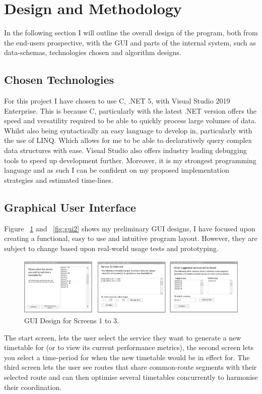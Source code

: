 \documentclass{article}
\newcommand{\CS}{C\nolinebreak\hspace{-.05em}\raisebox{.6ex}{\tiny\bf \#}}
\begin{document}
\section{Design and Methodology}

In the following section I will outline the overall design of the program, both from the end-users prospective, with the GUI and parts of the internal system, such as data-schemas, technologies chosen and algorithm designs.


\subsection{Chosen Technologies}
For this project I have chosen to use \CS, .NET 5, with Visual Studio 2019 Enterprise. This is because \CS, particularly with the latest .NET version offers the speed and versatility required to be able to quickly process large volumes of data. Whilst also being syntactically an easy language to develop in, particularly with the use of LINQ. Which allows for me to be able to declaratively query complex data structures with ease. Visual Studio also offers industry leading debugging tools to speed up development further. Moreover, it is my strongest programming language and as such I can be confident on my proposed implementation strategies and estimated time-lines.

\subsection{Graphical User Interface}

Figure ~\ref{fig:gui1} and ~\ref{fig:gui2} shows my preliminary GUI designs, I have focused upon creating a functional, easy to use and intuitive program layout. However, they are subject to change based upon real-world usage tests and prototyping.  

\begin{figure}[H]
	\centering
	\includegraphics[height=105px]{images/GUI_1.png}
	\caption{GUI Design for Screens 1 to 3.}
	\label{fig:gui1}
\end{figure}

The start screen, lets the user select the service they want to generate a new timetable for (or to view its current performance metrics), the second screen lets you select a time-period for when the new timetable would be in effect for. The third screen lets the user see routes that share common-route segments with their selected route and can then optimise several timetables concurrently to harmonise their coordination. 
\end{document}

